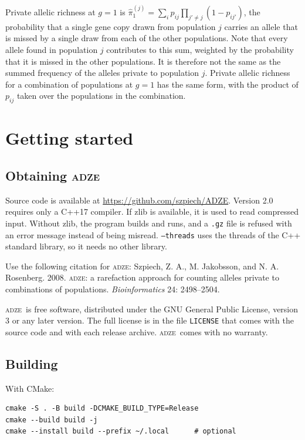 \documentclass[11pt]{article}
\newcommand{\prog}{\textsc{adze}}
\newcommand{\flag}[1]{\texttt{#1}}
\begin{document}
Private allelic richness at $g = 1$ is
$\hat{\pi}_1^{(j)} = \sum_i p_{ij} \prod_{j' \neq j} (1 - p_{ij'})$, the
probability that a single gene copy drawn from population $j$ carries an
allele that is missed by a single draw from each of the other populations.
Note that every allele found in population $j$ contributes to this sum,
weighted by the probability that it is missed in the other populations. It is
therefore not the same as the summed frequency of the alleles private to
population $j$. Private allelic richness for a combination of populations at
$g = 1$ has the same form, with the product of $p_{ij}$ taken over the
populations in the combination.

\section{Getting started}

\subsection{Obtaining \prog}

Source code is available at \url{https://github.com/szpiech/ADZE}. Version
2.0 requires only a C++17 compiler. If zlib is available, it is used to read
compressed input. Without zlib, the program builds and runs, and a \texttt{.gz}
file is refused with an error message instead of being misread.
\flag{--threads} uses the threads of the C++ standard library, so it needs no
other library.

Use the following citation for \prog: Szpiech, Z. A., M. Jakobsson, and
N. A. Rosenberg. 2008. \prog: a rarefaction approach for counting alleles
private to combinations of populations. \textit{Bioinformatics} 24:
2498--2504.

\prog\ is free software, distributed under the GNU General Public License,
version 3 or any later version. The full license is in the file
\texttt{LICENSE} that comes with the source code and with each release
archive. \prog\ comes with no warranty.

\subsection{Building}

With CMake:
\begin{Verbatim}[xleftmargin=1em]
cmake -S . -B build -DCMAKE_BUILD_TYPE=Release
cmake --build build -j
cmake --install build --prefix ~/.local      # optional
\end{Verbatim}
\end{document}
